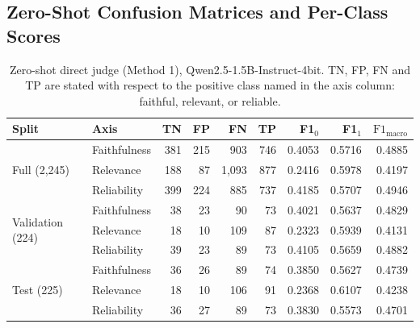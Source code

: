 \documentclass{zapiski}
\newcommand{\fmacro}{\mathrm{F1}_{\mathrm{macro}}}
\begin{document}
\subsection{Zero-Shot Confusion Matrices and Per-Class Scores}
\label{sec:appendix-confusion}

\begin{table}[H]
\centering
\caption{Zero-shot direct judge (Method 1), Qwen2.5-1.5B-Instruct-4bit. TN,
FP, FN and TP are stated with respect to the positive class named in the axis
column: faithful, relevant, or reliable.}
\label{tab:direct-confusion}
\footnotesize
\begin{tabular}{llrrrrrrr}
\toprule
Split & Axis & TN & FP & FN & TP & F1$_0$ & F1$_1$ & $\fmacro$ \\
\midrule
\multirow{3}{*}{Full (2,245)}
 & Faithfulness & 381 & 215 & 903 & 746 & 0.4053 & 0.5716 & 0.4885 \\
 & Relevance    & 188 &  87 & 1{,}093 & 877 & 0.2416 & 0.5978 & 0.4197 \\
 & Reliability  & 399 & 224 & 885 & 737 & 0.4185 & 0.5707 & 0.4946 \\
\midrule
\multirow{3}{*}{Validation (224)}
 & Faithfulness &  38 &  23 &  90 &  73 & 0.4021 & 0.5637 & 0.4829 \\
 & Relevance    &  18 &  10 & 109 &  87 & 0.2323 & 0.5939 & 0.4131 \\
 & Reliability  &  39 &  23 &  89 &  73 & 0.4105 & 0.5659 & 0.4882 \\
\midrule
\multirow{3}{*}{Test (225)}
 & Faithfulness &  36 &  26 &  89 &  74 & 0.3850 & 0.5627 & 0.4739 \\
 & Relevance    &  18 &  10 & 106 &  91 & 0.2368 & 0.6107 & 0.4238 \\
 & Reliability  &  36 &  27 &  89 &  73 & 0.3830 & 0.5573 & 0.4701 \\
\bottomrule
\end{tabular}
\end{table}
\end{document}
